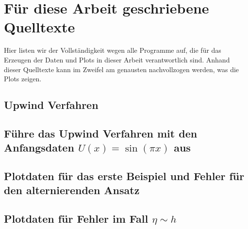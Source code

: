 \section{Für diese Arbeit geschriebene Quelltexte}
\label{appendix:transport:beispiel}

Hier listen wir der Vollständigkeit wegen alle Programme auf, die für das Erzeugen der Daten und Plots in dieser Arbeit verantwortlich sind.
Anhand dieser Quelltexte kann im Zweifel am genausten nachvollzogen werden, was die Plots zeigen.

\subsection*{Upwind Verfahren}


\subsection*{Führe das Upwind Verfahren mit den Anfangsdaten $U(x) = \sin(\pi x)$ aus}


\subsection*{Plotdaten für das erste Beispiel und Fehler für den alternierenden Ansatz}


\subsection*{Plotdaten für Fehler im Fall $\eta \sim h$}
